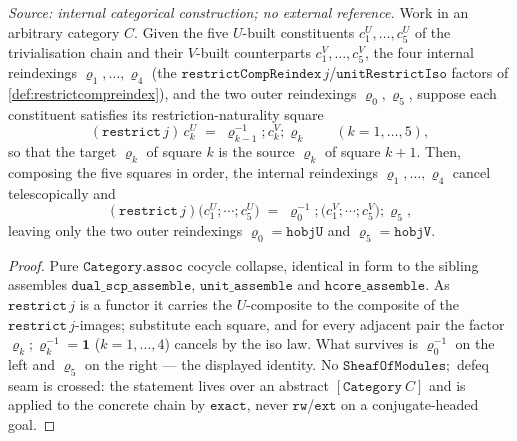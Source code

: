 \begin{lemma}\leanok
  \label{lem:trivialisation_telescope_assemble}
  \textit{Source: internal categorical construction; no external reference.}
  Work in an arbitrary category \(C\). Given the five \(U\)-built constituents \(c^U_1, \dots, c^U_5\)
  of the trivialisation chain and their \(V\)-built counterparts \(c^V_1, \dots, c^V_5\), the four
  internal reindexings \(\varrho_1, \dots, \varrho_4\) (the
  \(\mathtt{restrictCompReindex}\,j\)/\(\mathtt{unitRestrictIso}\) factors of
  \cref{def:restrictcompreindex}), and the two outer reindexings \(\varrho_0, \varrho_5\), suppose each
  constituent satisfies its restriction-naturality square
  \[
    (\mathtt{restrict}\,j)\,c^U_k \;=\; \varrho_{k-1}^{-1} \mathbin{;} c^V_k \mathbin{;} \varrho_k
    \qquad (k = 1, \dots, 5),
  \]
  so that the target \(\varrho_k\) of square \(k\) is the source \(\varrho_k\) of square \(k+1\). Then,
  composing the five squares in order, the internal reindexings \(\varrho_1, \dots, \varrho_4\) cancel
  telescopically and
  \[
    (\mathtt{restrict}\,j)\bigl(c^U_1 \mathbin{;} \cdots \mathbin{;} c^U_5\bigr)
      \;=\; \varrho_0^{-1} \mathbin{;} \bigl(c^V_1 \mathbin{;} \cdots \mathbin{;} c^V_5\bigr) \mathbin{;} \varrho_5,
  \]
  leaving only the two outer reindexings \(\varrho_0 = \mathtt{hobjU}\) and \(\varrho_5 = \mathtt{hobjV}\).
\end{lemma}
\begin{proof}

\leanok
  Pure \(\mathtt{Category.assoc}\) cocycle collapse, identical in form to the sibling assembles
  \(\mathtt{dual\_scp\_assemble}\), \(\mathtt{unit\_assemble}\) and \(\mathtt{hcore\_assemble}\). As
  \(\mathtt{restrict}\,j\) is a functor it carries the \(U\)-composite to the composite of the
  \(\mathtt{restrict}\,j\)-images; substitute each square, and for every adjacent pair the factor
  \(\varrho_k \mathbin{;} \varrho_k^{-1} = \mathbf{1}\) (\(k = 1, \dots, 4\)) cancels by the iso law.
  What survives is \(\varrho_0^{-1}\) on the left and \(\varrho_5\) on the right --- the displayed
  identity. No \(\mathtt{SheafOfModules} \mathbin{;}\) defeq seam is crossed: the statement lives over an
  abstract \([\mathtt{Category}\ C]\) and is applied to the concrete chain by \(\mathtt{exact}\), never
  \(\mathtt{rw}\)/\(\mathtt{ext}\) on a conjugate-headed goal.
\end{proof}

